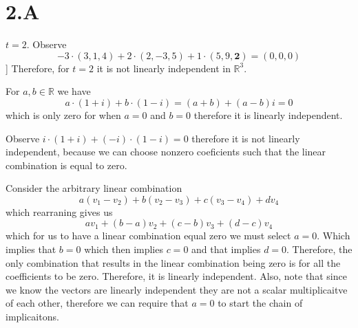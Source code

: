 \documentclass[10pt, twocolumn]{article}
\newcommand{\R}{\mathbb{R}}
\begin{document}
\section*{2.A}
\begin{q}[Problem 3]
    $ t = 2 $. 
    Observe
    $$ -3 \cdot (3, 1, 4) + 2 \cdot (2, -3, 5) + 1 \cdot (5, 9, \textbf{2}) = (0, 0 , 0) $$]
    Therefore, for $ t = 2$ it is not linearly independent in $ \R ^3 $.
\end{q}
\begin{q}[Problem 5(a)]
    For $ a, b \in \R $ we have 
    $$ a \cdot ( 1+ i) + b \cdot (1 - i) = (a + b) + (a-b) i = 0 $$
    which is only zero for when $ a = 0 $ and $ b = 0 $ therefore it is linearly independent.
\end{q}
\begin{q}[Problem 5(b)]
    Observe
    $ i \cdot (1 + i)  + (-i) \cdot (1 -i) = 0 $
    therefore it is not linearly independent, 
    because we can choose nonzero coeficients such that the linear combination is equal to zero.
\end{q}
\begin{q}[Problem 6]
    Consider the arbitrary linear combination 
    $$ a(v_1 - v_2) + b(v_2 - v_3) + c(v_3 - v_4) + d v_4 $$
    which rearraning gives us 
    $$ av_1 + (b-a)v_2 + (c-b)v_3 + (d-c) v_4 $$
    which for us to have a linear combination equal zero we must select $ a = 0$. 
    Which implies that $ b = 0$ which then implies $ c = 0 $ and that implies $ d = 0 $. 
    Therefore, the only combination that results in the linear combination being zero is for all the coefficients to be zero.
    Therefore, it is linearly independent. 
    Also, note that since we know the vectors are linearly independent they are not a scalar multiplicaitve of each other, therefore we can require that $ a = 0 $ to start the chain of implicaitons. 
\end{q}
\end{document}
